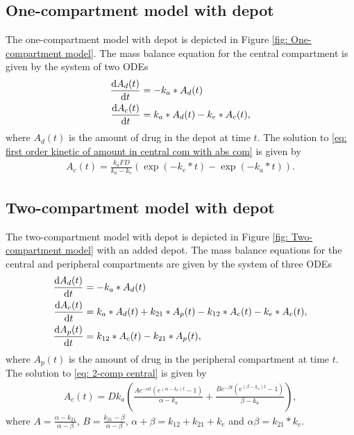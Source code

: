 \subsection{One-compartment model with depot}
The one-compartment model with depot is depicted in Figure \ref{fig: One-compartment model}. The mass balance equation for the central compartment is given by the system of two ODEs
\begin{align} \label{eq: first order kinetic of amount in central com with abs com}
    \frac{\mathrm{d} A_{d}(t)}{\mathrm{d}t}    &= - k_a * A_{d}(t) \nonumber\\
    \frac{\mathrm{d} A_{c}(t)}{\mathrm{d}t} &= k_a * A_{d}(t) - k_{e} * A_{c}(t),
\end{align}
where $A_{d}(t)$ is the amount of drug in the depot at time $t$.
The solution to \eqref{eq: first order kinetic of amount in central com with abs com} is given by
\begin{align} \label{eq: sol to first order kinetic of amount in central com with abs com}
    A_{c}(t) = \frac{k_a F D}{k_a - k_e} \left( \exp(-k_e * t) - \exp(-k_a * t) \right).
\end{align}

\subsection{Two-compartment model with depot}
The two-compartment model with depot is depicted in Figure \ref{fig: Two-compartment model} with an added depot. The mass balance equations for the central and peripheral compartments are given by the system of three ODEs
\begin{align}
    \frac{\mathrm{d} A_{d}(t)}{\mathrm{d}t}    &= - k_a * A_{d}(t) \nonumber \\
    \frac{\mathrm{d} A_{c}(t)}{\mathrm{d}t}    &= k_a * A_{d}(t) + k_{21} * A_{p}(t) - k_{12} * A_{c}(t) - k_e * A_{c}(t), \label{eq: 2-comp central}\\
    \frac{\mathrm{d} A_{p}(t)}{\mathrm{d}t} &= k_{12} * A_{c}(t) - k_{21} * A_{p}(t),\nonumber
\end{align}
where $A_p(t)$ is the amount of drug in the peripheral compartment at time $t$. The solution to \eqref{eq: 2-comp central} is given by
\begin{align*}
    A_{c}(t) = D  k_{a} \left( \frac{A e^{-\alpha t} \left( e^{(\alpha - k_{a})t} - 1 \right)}{\alpha - k_{a}} + \frac{B e^{-\beta t} \left( e^{(\beta - k_{a})t} - 1 \right)}{\beta - k_{a}} \right),
\end{align*}
where $A = \frac{\alpha - k_{21}}{\alpha - \beta}$, $B = \frac{k_{21} - \beta}{\alpha - \beta}$, $\alpha + \beta = k_{12} + k_{21} + k_{e}$ and $\alpha \beta = k_{21} * k_{e}$.


